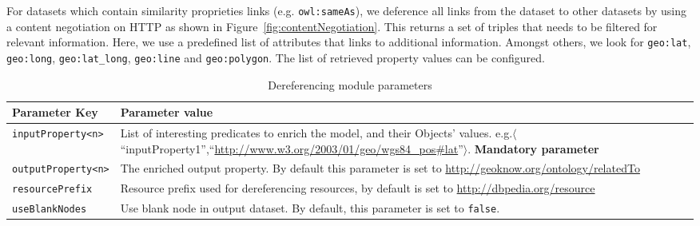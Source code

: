 \documentclass[a4paper,twoside,bibtotoc,abstracton,12pt,BCOR=15mm]{article}
\begin{document}
    For datasets which contain similarity proprieties links (e.g. \texttt{owl:sameAs}), we deference all links from the dataset to other datasets by using a content negotiation on HTTP as shown in Figure~\ref{fig:contentNegotiation}.
    This returns a set of triples that needs to be filtered for relevant information.
    Here, we use a predefined list of attributes that links to additional information.
    Amongst others, we look for \texttt{geo:lat}, \texttt{geo:long}, \texttt{geo:lat\_long}, \texttt{geo:line} and \texttt{geo:polygon}.
    The list of retrieved property values can be configured.


    \begin{table}
    \caption{Dereferencing module parameters} \label{tbl:derefPram}
    \small
    \begin{tabularx}{\textwidth}{@{}lX@{}}
    \toprule
    \textbf{Parameter Key} 		& \textbf{Parameter value}\\
    \toprule
    \texttt{inputProperty<n>} 	& List of interesting predicates to enrich the model, and their Objects' values. e.g.$\langle$``inputProperty1'',``\url{http://www.w3.org/2003/01/geo/wgs84_pos#lat}''$\rangle$. \textbf{Mandatory parameter}\\
    \midrule
    \texttt{outputProperty<n>} 	& The enriched output property. By default this parameter is set to \url{http://geoknow.org/ontology/relatedTo}\\
    \midrule
    \texttt{resourcePrefix} 	& Resource prefix used for dereferencing resources, by default is set to \url{http://dbpedia.org/resource}\\
    \midrule
    \texttt{useBlankNodes}		& Use blank node in output dataset. By default, this parameter is set to \texttt{false}.\\
    \bottomrule
    \end{tabularx}
    \end{table}
    
\end{document}

